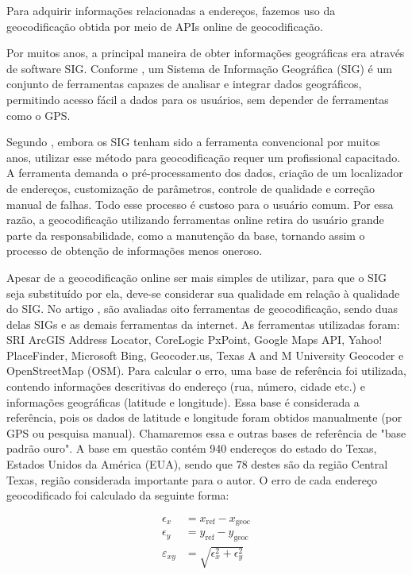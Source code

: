 Para adquirir informações relacionadas a endereços, fazemos uso da geocodificação obtida por meio de APIs online de geocodificação.

Por muitos anos, a principal maneira de obter informações geográficas era através de software SIG. Conforme \cite{stein2021geoprocessamento}, um Sistema de Informação Geográfica (SIG) é um conjunto de ferramentas capazes de analisar e integrar dados geográficos, permitindo acesso fácil a dados para os usuários, sem depender de ferramentas como o GPS.

Segundo \cite{Chow2016}, embora os SIG tenham sido a ferramenta convencional por muitos anos, utilizar esse método para geocodificação requer um profissional capacitado. A ferramenta demanda o pré-processamento dos dados, criação de um localizador de endereços, customização de parâmetros, controle de qualidade e correção manual de falhas. Todo esse processo é custoso para o usuário comum. Por essa razão, a geocodificação utilizando ferramentas online retira do usuário grande parte da responsabilidade, como a manutenção da base, tornando assim o processo de obtenção de informações menos oneroso.

Apesar de a geocodificação online ser mais simples de utilizar, para que o SIG seja substituído por ela, deve-se considerar sua qualidade em relação à qualidade do SIG. No artigo \cite{Chow2016}, são avaliadas oito ferramentas de geocodificação, sendo duas delas SIGs e as demais ferramentas da internet. As ferramentas utilizadas foram: SRI ArcGIS Address Locator, CoreLogic PxPoint, Google Maps API, Yahoo! PlaceFinder, Microsoft Bing, Geocoder.us, Texas A and M University Geocoder e OpenStreetMap (OSM). Para calcular o erro, uma base de referência foi utilizada, contendo informações descritivas do endereço (rua, número, cidade etc.) e informações geográficas (latitude e longitude). Essa base é considerada a referência, pois os dados de latitude e longitude foram obtidos manualmente (por GPS ou pesquisa manual). Chamaremos essa e outras bases de referência de "base padrão ouro". A base em questão contém 940 endereços do estado do Texas, Estados Unidos da América (EUA), sendo que 78 destes são da região Central Texas, região considerada importante para o autor. O erro de cada endereço geocodificado foi calculado da seguinte forma:

\begin{align}
   \epsilon_x &= x_{\text{ref}} - x_{\text{geoc}} \\
   \epsilon_y &= y_{\text{ref}} - y_{\text{geoc}} \\
   \varepsilon_{xy} &= \sqrt{\epsilon_x^2 + \epsilon_y^2}
\end{align}

